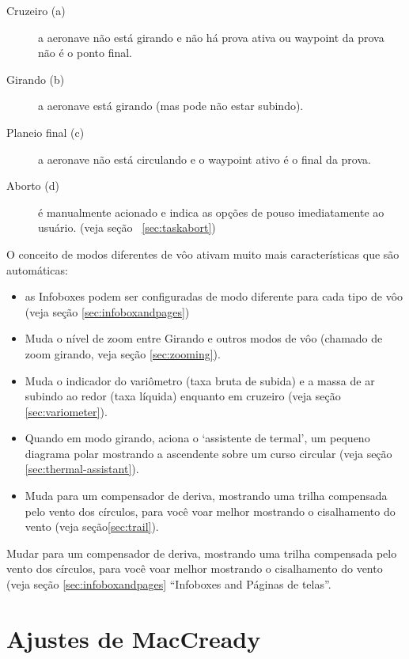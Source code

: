 \begin{description}
\item[Cruzeiro (a)]   a aeronave não está girando e não há prova ativa ou waypoint da prova não é o ponto final.
\item[Girando (b)]  a aeronave está girando (mas pode não estar subindo).
\item[Planeio final (c)]  a aeronave não está circulando e o waypoint ativo é o final da prova.

\item[Aborto (d)]  é manualmente acionado e indica as opções de pouso imediatamente ao usuário. (veja seção ~\ref{sec:taskabort})
\end{description}

O conceito de modos diferentes de vôo ativam muito mais características que são automáticas:
\begin{itemize}
\item {} as Infoboxes podem ser configuradas de modo diferente para cada tipo de vôo (veja seção \ref{sec:infoboxandpages})
\item {} Muda o nível de zoom entre Girando e outros modos de vôo (chamado de zoom girando, veja seção \ref{sec:zooming}).
\item {} Muda o indicador do variômetro (taxa bruta de subida) e a massa de ar subindo ao redor (taxa líquida) enquanto em cruzeiro (veja seção \ref{sec:variometer}).
\item {} Quando em modo girando, aciona o ‘assistente de termal’, um pequeno diagrama polar mostrando a ascendente sobre um curso circular  (veja seção \ref{sec:thermal-assistant}).
\item {} Muda para um compensador de deriva, mostrando uma trilha compensada pelo vento dos círculos, para você voar melhor mostrando o cisalhamento do vento (veja seção\ref{sec:trail}). 
\end{itemize}

Mudar para um compensador de deriva, mostrando uma trilha compensada pelo vento dos círculos, para você voar melhor mostrando o cisalhamento do vento (veja seção
\ref{sec:infoboxandpages} “Infoboxes and Páginas de telas”.


\section{Ajustes de MacCready}

